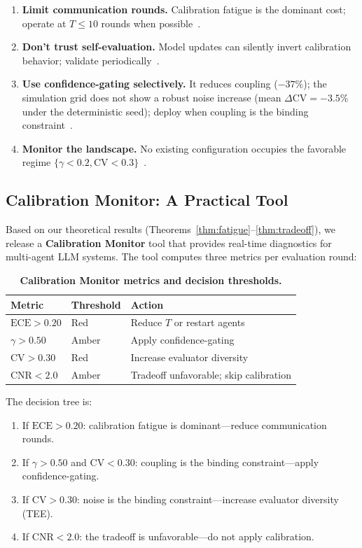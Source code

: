 \documentclass[11pt]{article}
\newcommand{\CV}{\ensuremath{\mathrm{CV}}}
\newcommand{\ECE}{\ensuremath{\mathrm{ECE}}}
\theoremstyle{definition}
\theoremstyle{remark}
\begin{document}
\begin{enumerate}[leftmargin=*,nosep]
    \item \textbf{Limit communication rounds.} Calibration fatigue is the dominant cost; operate at $T \leq 10$ rounds when possible~\citep{li2025sacd}.
    \item \textbf{Don't trust self-evaluation.} Model updates can silently invert calibration behavior; validate periodically~\citep{zhou2024incontext}.
    \item \textbf{Use confidence-gating selectively.} It reduces coupling ($-37\%$); the simulation grid does not show a robust noise increase (mean $\Delta\CV = -3.5\%$ under the deterministic seed); deploy when coupling is the binding constraint~\citep{chen2025unicr}.
    \item \textbf{Monitor the landscape.} No existing configuration occupies the favorable regime $\{\gamma < 0.2, \CV < 0.3\}$~\citep{caleffects2026}.
\end{enumerate}

\subsection{Calibration Monitor: A Practical Tool}

Based on our theoretical results (Theorems~\ref{thm:fatigue}--\ref{thm:tradeoff}), we release a \textbf{Calibration Monitor} tool that provides real-time diagnostics for multi-agent LLM systems. The tool computes three metrics per evaluation round:

\begin{table}[H]
\centering
\caption{\textbf{Calibration Monitor metrics and decision thresholds.}}
\begin{tabular}{@{}lll@{}}
\toprule
Metric & Threshold & Action \\
\midrule
$\ECE > 0.20$ & Red & Reduce $T$ or restart agents \\
$\gamma > 0.50$ & Amber & Apply confidence-gating \\
$\CV > 0.30$ & Red & Increase evaluator diversity \\
$\text{CNR} < 2.0$ & Amber & Tradeoff unfavorable; skip calibration \\
\bottomrule
\end{tabular}
\end{table}

The decision tree is:
\begin{enumerate}[leftmargin=*,nosep]
    \item If $\ECE > 0.20$: calibration fatigue is dominant---reduce communication rounds.
    \item If $\gamma > 0.50$ and $\CV < 0.30$: coupling is the binding constraint---apply confidence-gating.
    \item If $\CV > 0.30$: noise is the binding constraint---increase evaluator diversity (TEE).
    \item If $\text{CNR} < 2.0$: the tradeoff is unfavorable---do not apply calibration.
\end{enumerate}
\end{document}

